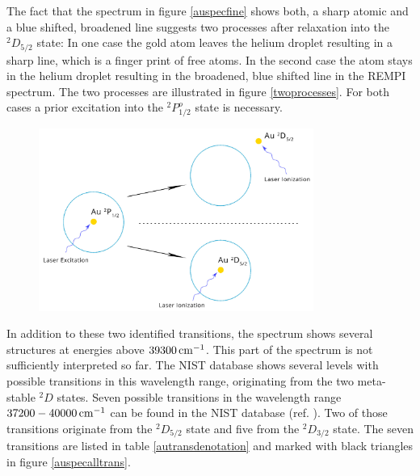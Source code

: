\documentclass[parskip,12pt,headsepline,a4paper] {scrbook}
\begin{document}
The fact that the spectrum in figure \ref{auspecfine} shows both, a sharp atomic and a blue shifted, broadened line suggests two processes after relaxation into the $^2D_{5/2}$ state: In one case the gold atom leaves the helium droplet resulting in a sharp line, which is a finger print of free atoms. In the second case the atom stays in the helium droplet resulting in the broadened, blue shifted line in the REMPI spectrum. The two processes are illustrated in figure \ref{twoprocesses}. For both cases a prior excitation into the $^2P^o_{1/2}$ state is necessary.

\begin{figure}[ht]
\centerline{
\includegraphics[width=9cm]{./results/Au_states.jpg}}
\end{figure}

In addition to these two identified transitions, the spectrum shows several structures at energies above $\unit[39300]{cm^{-1}}$. This part of the spectrum is not sufficiently interpreted so far. The NIST database shows several levels with possible transitions in this wavelength range, originating from the two meta-stable $^2D$ states. Seven possible transitions in the wavelength range $\unit[37200-40000]{cm^{-1}}$ can be found in the NIST database (ref. \cite{nist}). Two of those transitions originate from the $^2D_{5/2}$ state and five from the $^2D_{3/2}$ state. The seven transitions are listed in table \ref{autransdenotation} and marked with black triangles in figure \ref{auspecalltrans}. %
\end{document}
